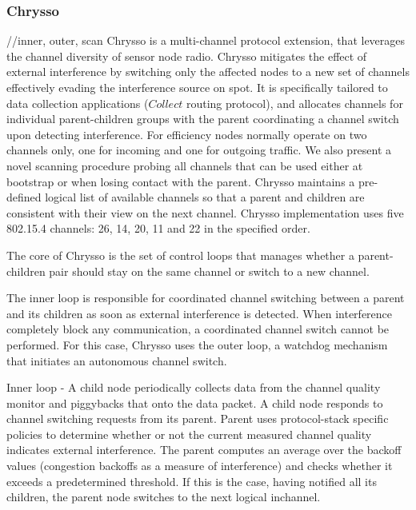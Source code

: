 \subsubsection{Chrysso}
//inner, outer, scan
Chrysso is a multi-channel protocol extension, that leverages the channel diversity of sensor node radio. Chrysso mitigates the effect of external interference by switching only the affected nodes to a new set of channels effectively evading the interference source on spot. It is specifically tailored to data collection applications ($Collect$ routing protocol), and allocates channels for individual parent-children groups with the parent coordinating a channel switch upon detecting interference. For efficiency nodes normally operate on two channels only, one for incoming and one for outgoing traffic. We also present a novel scanning procedure probing all channels that can be used either at bootstrap or when losing contact with the parent. Chrysso maintains a pre-defined logical list of available channels so that a parent and children are consistent with their view on the next channel. Chrysso implementation uses five 802.15.4 channels: 26, 14, 20, 11 and 22 in the specified order. 

The core of Chrysso is the set of control loops that manages whether a parent-children pair should stay on the same channel or switch to a new channel.

The inner loop is responsible for coordinated channel switching between a parent and its children as soon as external interference is detected. When interference completely block any communication, a coordinated channel switch cannot be performed. For this case, Chrysso uses the outer loop, a watchdog mechanism that initiates an autonomous channel switch.

Inner loop - A child node periodically collects data from the channel quality monitor and piggybacks that onto the data packet. A child node responds to channel switching requests from its parent. Parent uses protocol-stack specific policies to determine whether or not the current measured channel quality indicates external interference. The parent computes an average over the backoff values (congestion backoffs as a measure of interference) and checks whether it exceeds a predetermined threshold. If this is the case, having notified all its children, the parent node switches to the next logical inchannel. 

